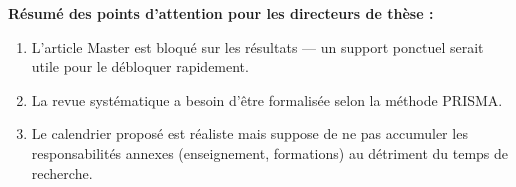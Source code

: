 \documentclass[12pt, a4paper]{report}
\begin{document}
\vspace{1cm}
\begin{notebox}
\textbf{Résumé des points d'attention pour les directeurs de thèse :}
\begin{enumerate}[noitemsep]
  \item L'article Master est bloqué sur les résultats — un support ponctuel serait utile
  pour le débloquer rapidement.
  \item La revue systématique a besoin d'être formalisée selon la méthode PRISMA.
  \item Le calendrier proposé est réaliste mais suppose de ne pas accumuler les
  responsabilités annexes (enseignement, formations) au détriment du temps de recherche.
\end{enumerate}
\end{notebox}


\small  %
\end{document}
